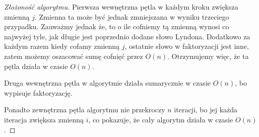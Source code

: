 \documentclass{article}
\begin{document}
\begin{proof}[Złożoność algorytmu]    
    Pierwsza wewnętrzna pętla w każdym kroku zwiększa zmienną $j$. Zmienna ta
    może być jednak zmniejszana w wyniku trzeciego przypadku. Zauważmy jednak że, 
    to o ile cofniemy tą zmienną wynosi co najwyżej tyle, jak długie jest poprzednio dodane słowo Lyndona. 
    Dodatkowo za każdym razem kiedy cofamy zmienną $j$, ostatnie słowo w faktoryzacji jest inne, zatem
    możemy oszacować sumę cofnięć przez $O(n)$. Otrzymujemy więc, że ta pętla działa w czasie $O(n)$.
    
    Druga wewnętrzna pętla w algorytmie działa sumarycznie w czasie $O(n)$, bo wypisuje faktoryzację.

    Ponadto zewnętrzna pętla algorytmu nie przekroczy $n$ iteracji, 
    bo jej każda iteracja zwiększa zmienną $i$, co pokazuje, że cały algorytm działa w czasie $O(n)$.
\end{proof}
\end{document}
